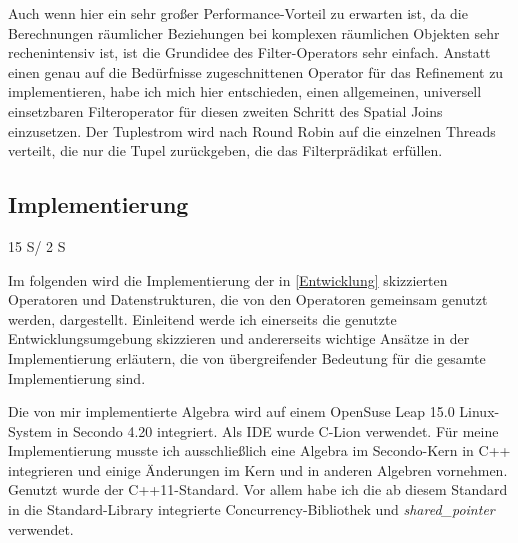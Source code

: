 \documentclass[a4paper,12pt,twoside]{article}
\newcommand{\Fb}[1]{\textit{#1}} %
\begin{document}
{Auch wenn hier ein sehr großer Performance-Vorteil zu erwarten ist, da die Berechnungen räumlicher Beziehungen bei komplexen räumlichen Objekten sehr rechenintensiv ist, ist die Grundidee des Filter-Operators sehr einfach. Anstatt einen genau auf die Bedürfnisse zugeschnittenen Operator für das Refinement zu implementieren, habe ich mich hier entschieden, einen allgemeinen, universell einsetzbaren Filteroperator für diesen zweiten Schritt des Spatial Joins einzusetzen. Der Tuplestrom wird nach Round Robin auf die einzelnen Threads verteilt, die nur die Tupel zurückgeben, die das Filterprädikat erfüllen.

\subsection{Implementierung} 15 S/ 2 S
\label{Implemeniterung} 

Im folgenden wird die Implementierung der in \autoref{Entwicklung} skizzierten Operatoren und Datenstrukturen, die von den Operatoren gemeinsam genutzt werden, dargestellt. Einleitend werde ich einerseits die genutzte Entwicklungsumgebung skizzieren und andererseits wichtige Ansätze in der Implementierung erläutern, die von übergreifender Bedeutung für die gesamte Implementierung sind.

Die von mir implementierte Algebra wird auf einem OpenSuse Leap 15.0 Linux-System in Secondo 4.20 integriert. Als IDE wurde C-Lion verwendet. Für meine Implementierung musste ich ausschließlich eine Algebra im Secondo-Kern in C++ integrieren und einige Änderungen im Kern und in anderen Algebren vornehmen. Genutzt wurde der C++11-Standard. Vor allem habe ich die ab diesem Standard in die Standard-Library integrierte Concurrency-Bibliothek und \Fb{shared\_pointer} verwendet.

}
\end{document}
